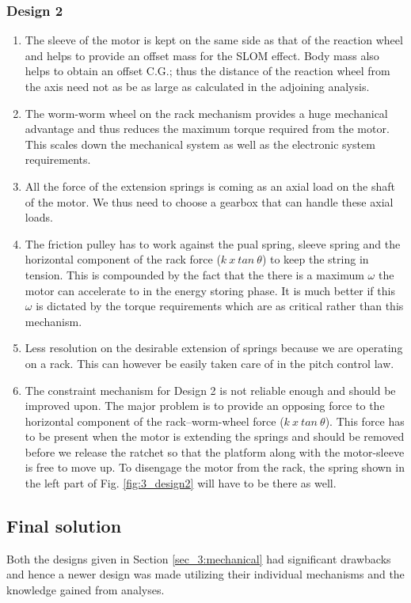 \subsubsection*{Design 2}
\begin{enumerate}
 \item
The sleeve of the motor is kept on the same side as that of the reaction wheel and helps to provide an offset mass for the SLOM effect. Body mass also helps to obtain an offset C.G.; thus the distance of the reaction wheel from the axis need not as be as large as calculated in the adjoining analysis.
\item
The worm-worm wheel on the rack mechanism provides a huge mechanical advantage and thus reduces the maximum torque required from the motor. This scales down the mechanical system as well as the electronic system requirements.
\item
All the force of the extension springs is coming as an axial load on the shaft of the motor. We thus
need to choose a gearbox that can handle these axial loads.
\item
The friction pulley has to work against the pual spring, sleeve spring and the horizontal component of the rack force ($k\:x\:tan\:\theta$) to keep the string in tension. This is compounded by the fact that the there is a maximum $\omega$ the motor can
accelerate to in the energy storing phase. It is much better if this $\omega$ is dictated by the torque requirements which are as
critical rather than this mechanism.
\item
Less resolution on the desirable extension of springs because we are operating on a rack. This can however be easily taken care of in the pitch control law.
\item
The constraint mechanism for Design 2 is not reliable enough and should be improved upon. The major problem is to provide an opposing force to the horizontal component of the rack--worm-wheel force ($k\:x\:tan\:\theta$). This force has to be present when the motor is extending the springs and should be removed before we release the ratchet so that the platform along with the motor-sleeve is free to move up. To disengage the motor from the rack, the spring shown in the left part of Fig. \ref {fig:3_design2} will have to be there as well.
\end{enumerate}

\subsection*{Final solution}
Both the designs given in Section \ref{sec_3:mechanical} had significant drawbacks and hence a newer design was made utilizing their individual mechanisms and the knowledge gained from analyses.

